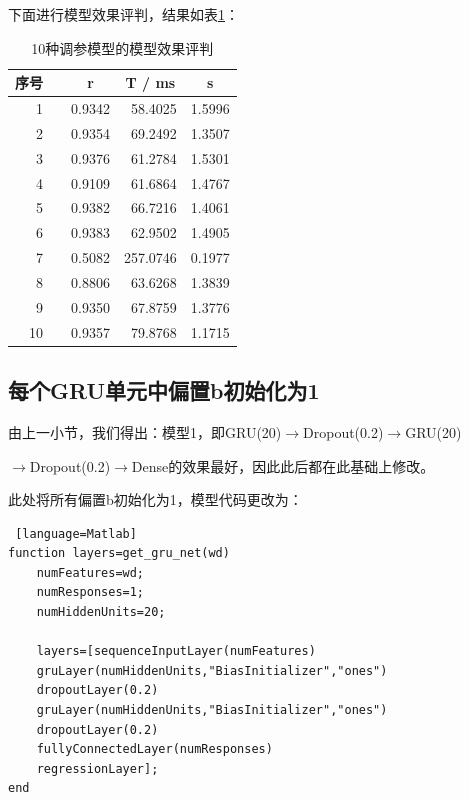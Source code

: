 \documentclass{jnuthesis}
\begin{document}
下面进行模型效果评判，结果如表\ref{tab:my-table1}：


\begin{table}[H]
	\centering
	\caption{10种调参模型的模型效果评判}
	\label{tab:my-table1}
	\begin{tabular}{rrrrr}
		\hline
		序号& & \multicolumn{1}{c}{r} & \multicolumn{1}{c}{T / ms} & \multicolumn{1}{c}{s} \\ \hline
		1 & & 0.9342                & 58.4025               & 1.5996                \\
		2&  & 0.9354                & 69.2492               & 1.3507                \\
		3 & & 0.9376                & 61.2784               & 1.5301                \\
		4  && 0.9109                & 61.6864               & 1.4767                \\
		5  && 0.9382                & 66.7216               & 1.4061                \\
		6  && 0.9383                & 62.9502               & 1.4905                \\
		7  && 0.5082                & 257.0746              & 0.1977                \\
		8  && 0.8806                & 63.6268               & 1.3839                \\
		9  && 0.9350                & 67.8759               & 1.3776                \\
		10 && 0.9357                & 79.8768               & 1.1715                \\ \hline
	\end{tabular}
\end{table}


\subsection{每个GRU单元中偏置b初始化为1\cite{jozefowicz2015empirical}}

由上一小节，我们得出：模型1，即GRU(20)$ \rightarrow $Dropout(0.2)$ \rightarrow $GRU(20)

\noindent$ \rightarrow $Dropout(0.2)$ \rightarrow $Dense的效果最好，因此此后都在此基础上修改。

此处将所有偏置b初始化为1，模型代码更改为：
\begin{lstlisting} [language=Matlab]
function layers=get_gru_net(wd)
	numFeatures=wd;
	numResponses=1;
	numHiddenUnits=20;
	
	layers=[sequenceInputLayer(numFeatures)
	gruLayer(numHiddenUnits,"BiasInitializer","ones")
	dropoutLayer(0.2)
	gruLayer(numHiddenUnits,"BiasInitializer","ones")
	dropoutLayer(0.2)
	fullyConnectedLayer(numResponses)
	regressionLayer];
end
\end{lstlisting}
\end{document}
